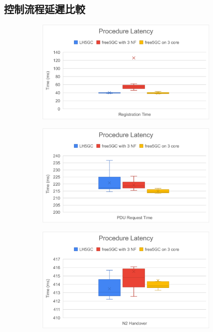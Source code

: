 \subsection{控制流程延遲比較}
\label{subsec:cp_proc_comp}

\begin{figure}[htb]
    \centering
    \begin{subfigure}[b]{.5\linewidth}
        \centering
        \includegraphics[height=!,width=0.95\linewidth,keepaspectratio=true]{figures/cp_proc_reg}
        \caption[]{{\footnotesize}}
        \label{fig:cp_proc_reg}
    \end{subfigure}%
    \begin{subfigure}[b]{.5\linewidth}
        \centering
        \includegraphics[height=!,width=0.95\linewidth,keepaspectratio=true]{figures/cp_proc_sess}
        \caption[]{{\footnotesize}}
        \label{fig:cp_proc_sess}
    \end{subfigure}
    \begin{subfigure}[b]{.5\linewidth}
        \centering
        \includegraphics[height=!,width=0.95\linewidth,keepaspectratio=true]{figures/cp_proc_ho}

\end{subfigure}
\end{figure}
